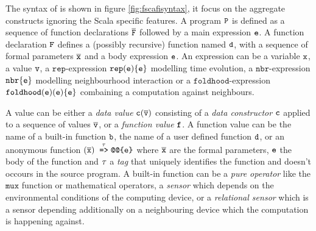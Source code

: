The syntax of \FSCAFI is shown in figure \ref{fig:fscafisyntax}, it focus on the aggregate constructs ignoring the Scala specific features. A program $\mathtt{P}$ is defined as a sequence of function declarations $\overline{\mathtt{F}}$ followed by a main expression $\mathtt{e}$. A function declaration $\mathtt{F}$ defines a (possibly recursive) function named $\mathtt{d}$, with a sequence of formal parameters $\overline{\mathtt{x}}$ and a body expression $\mathtt{e}$. An expression can be a variable $\mathtt{x}$, a value $\mathtt{v}$, a $\mathtt{rep}$-expression $\mathtt{rep}(\mathtt{e})\{ \mathtt{e} \}$ modelling time evolution, a $\mathtt{nbr}$-expression $\mathtt{nbr}\{\mathtt{e}\}$ modelling neighbourhood interaction or a $\mathtt{foldhood}$-expression $\mathtt{foldhood}(\mathtt{e})(\mathtt{e})\{\mathtt{e}\}$ combaining a computation against neighbours.

A value can be either a \textit{data value} $\mathtt{c}(\overline{\mathtt{v}})$ consisting of a \textit{data constructor} $\mathtt{c}$ applied to a sequence of values $\overline{\mathtt{v}}$, or a \textit{function value} $\mathtt{f}$. A function value can be the name of a built-in function $\mathtt{b}$, the name of a user defined function $\mathtt{d}$, or an anonymous function $(\overline{\mathtt{x}}) \; \stackrel{\tau}{\mathrm{\texttt{=>}}}\mathrm{ \texttt{@@\{} \mathtt{e} \texttt{\}}}$ where $\overline{\mathtt{x}}$ are the formal parameters, $\mathtt{e}$ the body of the function and $\tau$ a \textit{tag} that uniquely identifies the function and doesn't occours in the source program. A built-in function can be a \textit{pure operator} like the $\mathtt{mux}$ function or mathematical operators, a \textit{sensor} which depends on the environmental conditions of the computing device, or a \textit{relational sensor} which is a sensor depending additionally on a neighbouring device which the computation is happening against.

